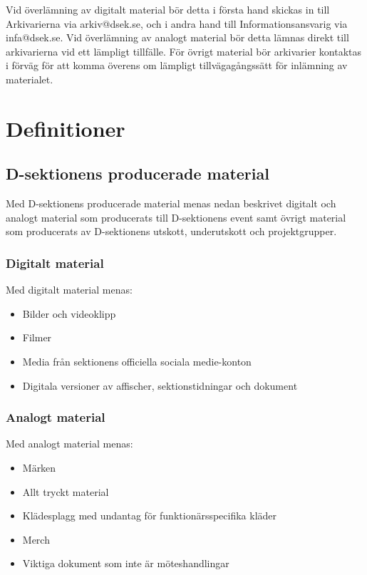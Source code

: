 \documentclass{dsekprotokoll}
\begin{document}
Vid överlämning av digitalt material bör detta i första hand skickas
in till Arkivarierna via arkiv@dsek.se, och i andra hand till
Informationsansvarig via infa@dsek.se. Vid överlämning av analogt
material bör detta lämnas direkt till arkivarierna vid ett lämpligt
tillfälle. För övrigt material bör arkivarier kontaktas i förväg för
att komma överens om lämpligt tillvägagångssätt för inlämning av materialet.


\section{Definitioner}

\subsection{D-sektionens producerade material}
Med D-sektionens producerade material menas nedan beskrivet digitalt
och analogt material som producerats till D-sektionens event samt
övrigt material som producerats av D-sektionens utskott, underutskott
och projektgrupper.

\subsubsection*{Digitalt material}
Med digitalt material menas:
\begin{itemize}
  \item Bilder och videoklipp
  \item Filmer
  \item Media från sektionens officiella sociala medie-konton
  \item Digitala versioner av affischer, sektionstidningar och dokument
\end{itemize}

\subsubsection*{Analogt material}
Med analogt material menas:
\begin{itemize}
  \item Märken
  \item Allt tryckt material
  \item Klädesplagg med undantag för funktionärsspecifika kläder
  \item Merch
  \item Viktiga dokument som inte är möteshandlingar
\end{itemize}
\end{document}
